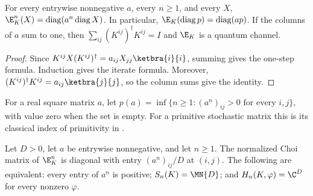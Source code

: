 \begin{theorem}
    \label{thm:stochastic_kraus_iterates}
    \leanok
    For every entrywise nonnegative $a$, every $n\ge1$, and every $X$,
    $\E_K^n(X)=\operatorname{diag}(a^n\operatorname{diag}X)$.
    In particular, $\E_K(\operatorname{diag}p)=\operatorname{diag}(ap)$.
    If the columns of $a$ sum to one, then
    $\sum_{ij}(K^{ij})^\dagger K^{ij}=I$ and $\E_K$ is a quantum channel.
\end{theorem}

\begin{proof}\leanok
    Since $K^{ij}X(K^{ij})^\dagger=a_{ij}X_{jj}\ketbra{i}{i}$,
    summing gives the one-step formula. Induction gives the iterate formula.
    Moreover, $(K^{ij})^\dagger K^{ij}=a_{ij}\ketbra{j}{j}$,
    so the column sums give the identity.
\end{proof}

\begin{definition}
    \label{def:classical_positive_power_index}
    \leanok
    For a real square matrix $a$, let
    $p(a)=\inf\{n\ge1:(a^n)_{ij}>0\text{ for every }i,j\}$,
    with value zero when the set is empty.
    For a primitive stochastic matrix this is its classical index of
    primitivity in \cite[Proposition~2]{Sanz2010Quantum}.
\end{definition}

\begin{theorem}
    \label{thm:stochastic_positive_power_spans}
    \leanok
    Let $D>0$, let $a$ be entrywise nonnegative, and let $n\ge1$.
    The normalized Choi matrix of $\E_K^n$ is diagonal with entry
    $(a^n)_{ij}/D$ at $(i,j)$. The following are equivalent:
    every entry of $a^n$ is positive; $S_n(K)=\MN{D}$; and
    $H_n(K,\varphi)=\C^D$ for every nonzero $\varphi$.
\end{theorem}

